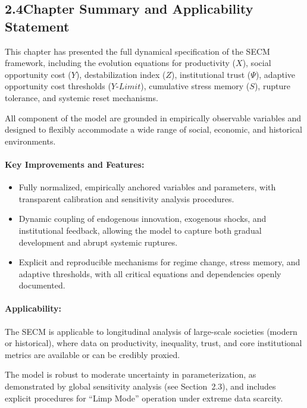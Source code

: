 \documentclass[12pt]{report}
\begin{document}
\subsection[2.4 Chapter Summary and Applicability Statement]{2.4\quad Chapter Summary and Applicability Statement}

This chapter has presented the full dynamical specification of the SECM framework, including the evolution equations for productivity ($X$), social opportunity cost ($Y$), destabilization index ($Z$), institutional trust ($\Psi$), adaptive opportunity cost thresholds ($Y\text{-}Limit$), cumulative stress memory ($S$), rupture tolerance, and systemic reset mechanisms.

All component of the model are grounded in empirically observable variables and designed to flexibly accommodate a wide range of social, economic, and historical environments.

\paragraph{Key Improvements and Features:}
\begin{itemize}
  \item Fully normalized, empirically anchored variables and parameters, with transparent calibration and sensitivity analysis procedures.
  \item Dynamic coupling of endogenous innovation, exogenous shocks, and institutional feedback, allowing the model to capture both gradual development and abrupt systemic ruptures.
  \item Explicit and reproducible mechanisms for regime change, stress memory, and adaptive thresholds, with all critical equations and dependencies openly documented.
\end{itemize}

\paragraph{Applicability:}
The SECM is applicable to longitudinal analysis of large-scale societies (modern or historical), where data on productivity, inequality, trust, and core institutional metrics are available or can be credibly proxied.

The model is robust to moderate uncertainty in parameterization, as demonstrated by global sensitivity analysis (see Section~2.3), and includes explicit procedures for ``Limp Mode'' operation under extreme data scarcity.
\end{document}
